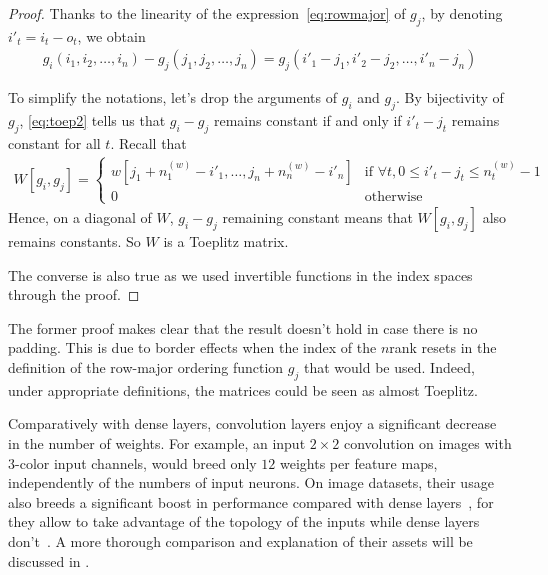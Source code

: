 \begin{proof}
Thanks to the linearity of the expression~\eqref{eq:rowmajor} of $g_j$, by denoting $i'_t = i_t - o_t$, we obtain
\begin{gather}
  g_i(i_1, i_2, \ldots, i_n) - g_j(j_1, j_2, \ldots, j_n) = g_j(i'_1 - j_1, i'_2 - j_2, \ldots, i'_n - j_n)
\label{eq:toep2}
\end{gather}

To simplify the notations, let's drop the arguments of $g_i$ and $g_j$. By bijectivity of $g_j$, \eqref{eq:toep2} tells us that $g_i - g_j$ remains constant if and only if $i'_t - j_t$ remains constant for all $t$. Recall that 
\begin{gather}
  W[g_i,g_j] =
 \begin{cases}
   w[j_1 + n_1^{(w)} - i'_1, \ldots, j_n + n_n^{(w)} - i'_n] & \text{if } \forall t, 0 \le i'_t - j_t \le n_t^{(w)} - 1 \\
   0 & \text{otherwise}
 \end{cases}
\label{eq:toep3}
\end{gather}
Hence, on a diagonal of $W$, $g_i - g_j$ remaining constant means that $W[g_i,g_j]$ also remains constants. So $W$ is a Toeplitz matrix.

The converse is also true as we used invertible functions in the index spaces through the proof.
\end{proof}

\begin{remark}
The former proof makes clear that the result doesn't hold in case there is no padding. This is due to border effects when the index of the $n$\powth rank resets in the definition of the row-major ordering function $g_j$ that would be used. Indeed, under appropriate definitions, the matrices could be seen as almost Toeplitz.
\end{remark}

\begin{remark}
Comparatively with dense layers, convolution layers enjoy a significant decrease in the number of weights. For example, an input $2 \times 2$ convolution on images with $3$-color input channels, would breed only $12$ weights per feature maps, independently of the numbers of input neurons. On image datasets, their usage also breeds a significant boost in performance compared with dense layers~\citep{krizhevsky2012imagenet}, for they allow to take advantage of the topology of the inputs while dense layers don't~\citep{lecun1995convolutional}. A more thorough comparison and explanation of their assets will be discussed in .
\end{remark}

